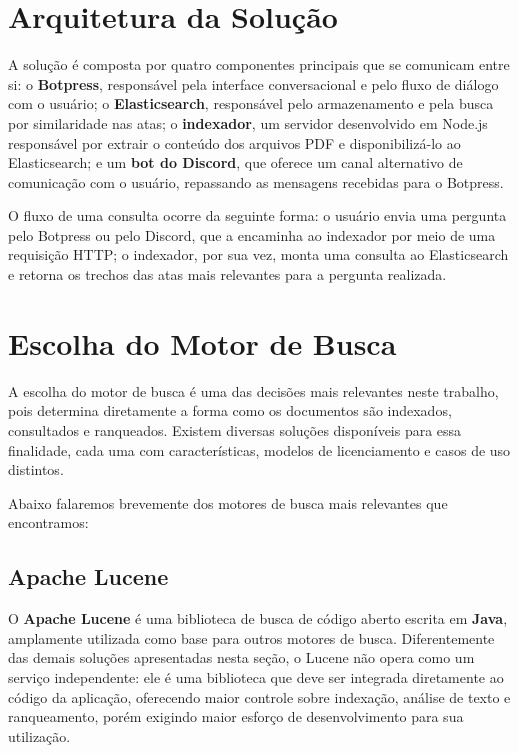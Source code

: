 \section{Arquitetura da Solução}\label{sec:arquitetura-solucao}

A solução é composta por quatro componentes principais que se comunicam entre si: o \textbf{Botpress}, responsável pela interface conversacional e pelo fluxo de diálogo com o usuário; o \textbf{Elasticsearch}, responsável pelo armazenamento e pela busca por similaridade nas atas; o \textbf{indexador}, um servidor desenvolvido em Node.js responsável por extrair o conteúdo dos arquivos PDF e disponibilizá-lo ao Elasticsearch; e um \textbf{bot do Discord}, que oferece um canal alternativo de comunicação com o usuário, repassando as mensagens recebidas para o Botpress.

O fluxo de uma consulta ocorre da seguinte forma: o usuário envia uma pergunta pelo Botpress ou pelo Discord, que a encaminha ao indexador por meio de uma requisição HTTP; o indexador, por sua vez, monta uma consulta ao Elasticsearch e retorna os trechos das atas mais relevantes para a pergunta realizada.

\section{Escolha do Motor de Busca}\label{sec:motor-busca}

A escolha do motor de busca é uma das decisões mais relevantes neste trabalho, pois determina diretamente a forma como os documentos são indexados, consultados e ranqueados. Existem diversas soluções disponíveis para essa finalidade, cada uma com características, modelos de licenciamento e casos de uso distintos.

Abaixo falaremos brevemente dos motores de busca mais relevantes que encontramos:

\subsection{Apache Lucene}

O \textbf{Apache Lucene} \cite{lucene-docs} é uma biblioteca de busca de código aberto escrita em \textbf{Java}, amplamente utilizada como base para outros motores de busca. Diferentemente das demais soluções apresentadas nesta seção, o Lucene não opera como um serviço independente: ele é uma biblioteca que deve ser integrada diretamente ao código da aplicação, oferecendo maior controle sobre indexação, análise de texto e ranqueamento, porém exigindo maior esforço de desenvolvimento para sua utilização.

